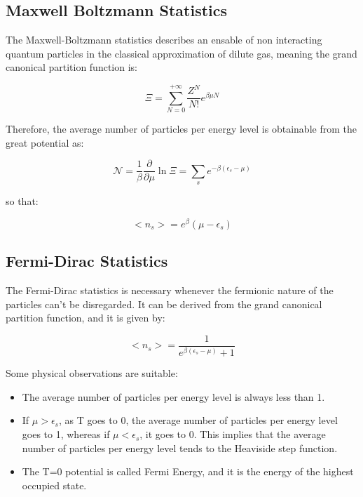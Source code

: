 \documentclass{article}
\begin{document}
\subsection{Maxwell Boltzmann Statistics}

The Maxwell-Boltzmann statistics describes an ensable of non interacting quantum particles in the classical
approximation of dilute gas, meaning the grand canonical partition function is:

\begin{equation}
    \Xi=\sum_{N=0}^{+\infty}\frac{Z^N}{N!}e^{\beta\mu N}
\end{equation}

Therefore, the average number of particles per energy level is obtainable from the great potential as:

\begin{equation}
    \mathcal{N}=\frac{1}{\beta}\frac{\partial}{\partial \mu}\ln{\Xi}=\sum_{s} e^{-\beta(\epsilon_s-\mu)}
\end{equation}

so that:

\begin{equation}
    <n_s>=e^\beta(\mu-\epsilon_s)
\end{equation}


\subsection{Fermi-Dirac Statistics}

The Fermi-Dirac statistics is necessary whenever the fermionic nature of the particles
can't be disregarded.
It can be derived from the grand canonical partition function, and it is given by:

\begin{equation}
    <n_s>=\frac{1}{e^{\beta(\epsilon_s-\mu)}+1}
\end{equation}

Some physical observations are suitable:

\begin{itemize}
    \item The average number of particles per energy level is always less than 1.
    \item If $\mu>\epsilon_s$, as T goes to 0, the average number of particles per energy level goes to 1,
          whereas if $\mu<\epsilon_s$, it goes to 0. This implies that the average number of particles per energy level tends to
          the Heaviside step function.
    \item The T=0 potential is called Fermi Energy, and it is the energy of the highest occupied state.
\end{itemize}
\end{document}

